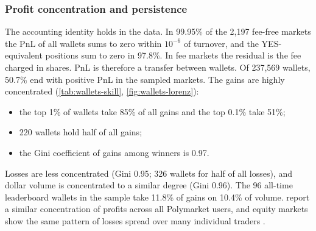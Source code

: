 \subsubsection{Profit concentration and persistence}\label{sec:res-wallets-skill}

The accounting identity holds in the data. In 99.95\% of the
2{,}197 fee-free markets the PnL of all wallets sums to zero within $10^{-6}$ of turnover, and the
YES-equivalent positions sum to zero in 97.8\%. In fee markets the residual is
the fee charged in shares. PnL is therefore a transfer between wallets. Of 237{,}569
wallets, 50.7\% end with positive PnL in the sampled markets. The gains are highly
concentrated (\cref{tab:wallets-skill}, \cref{fig:wallets-lorenz}):
\begin{itemize}
  \item the top 1\% of wallets take 85\% of all gains and the top 0.1\%
    take 51\%;
  \item 220 wallets hold half of all gains;
  \item the Gini coefficient of gains among winners is 0.97.
\end{itemize}
Losses are less concentrated (Gini 0.95; 326 wallets
for half of all losses), and dollar volume is concentrated to a similar degree (Gini 0.96).
The 96 all-time leaderboard wallets in the sample take 11.8\% of gains on
10.4\% of volume. \citet{akey2026} report a similar concentration of profits across all
Polymarket users, and equity markets show the same pattern of losses spread over many individual traders
\citep{barberodean2000,barberleeliuodean2009}.

